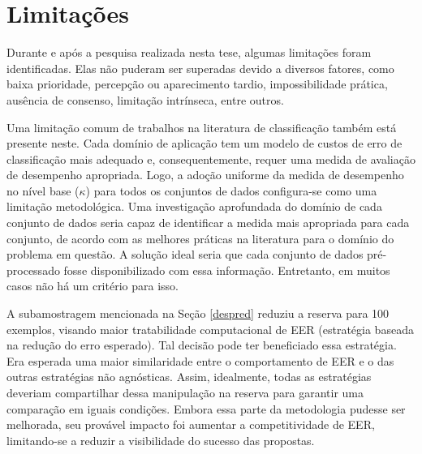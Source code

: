 \section{Limitações}\label{limitacoes}

Durante e após a pesquisa realizada nesta tese, algumas limitações foram identificadas.
Elas não puderam ser superadas devido a diversos fatores, como baixa prioridade, percepção ou aparecimento tardio, impossibilidade prática, ausência de consenso, limitação intrínseca, entre outros.

Uma limitação comum de trabalhos na literatura de classificação também está presente neste.
Cada domínio de aplicação tem um modelo de custos de erro de classificação mais adequado e, consequentemente, requer uma medida de avaliação de desempenho apropriada.
Logo, a adoção uniforme da medida de desempenho no nível base ($\kappa$) para todos os conjuntos de dados configura-se como uma limitação metodológica.
Uma investigação aprofundada do domínio de cada conjunto de dados seria capaz de identificar a medida mais apropriada para cada conjunto, de acordo com as melhores práticas na literatura para o domínio do problema em questão.
A solução ideal seria que cada conjunto de dados pré-processado fosse disponibilizado com essa informação. Entretanto, em muitos casos não há um critério para isso.

A subamostragem mencionada na Seção \ref{despred} reduziu a reserva para 100 exemplos, visando maior tratabilidade computacional de EER (estratégia baseada na redução do erro esperado).
Tal decisão pode ter beneficiado essa estratégia.
Era esperada uma maior similaridade entre o comportamento de EER e o das outras estratégias não agnósticas.
Assim, idealmente, todas as estratégias deveriam compartilhar dessa manipulação na reserva para garantir uma comparação em iguais condições.
Embora essa parte da metodologia pudesse ser melhorada, seu provável impacto foi aumentar a competitividade de EER, limitando-se a reduzir a visibilidade do sucesso das propostas.


